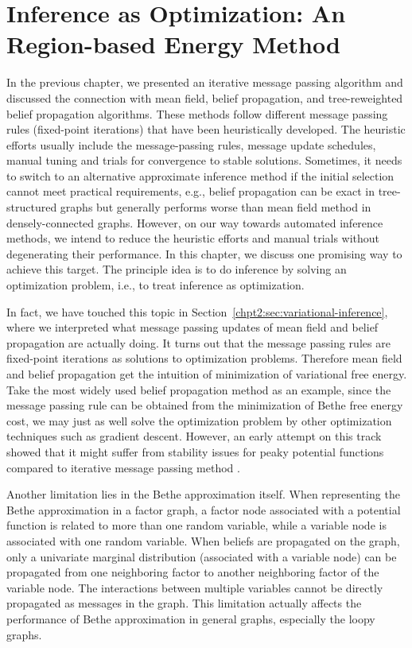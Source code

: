 \chapter{Inference as Optimization: An Region-based Energy Method}
\label{chapter4}
In the previous chapter, we presented an iterative message passing algorithm and discussed the connection with mean field, belief propagation, and tree-reweighted belief propagation algorithms. These methods follow different message passing rules (fixed-point iterations) that have been heuristically developed.
The heuristic efforts usually include the message-passing rules, message update schedules, manual tuning and trials for convergence to stable solutions. Sometimes, it needs to switch to an alternative approximate inference method if the initial selection cannot meet practical requirements, e.g., belief propagation can be exact in tree-structured graphs but generally performs worse than mean field method in densely-connected graphs.
However, on our way towards automated inference methods, we intend to reduce the heuristic efforts and manual trials without degenerating their performance. In this chapter, we discuss one promising way to achieve this target. The principle idea is to do inference by solving an optimization problem, i.e., to treat inference as optimization.

In fact, we have touched this topic in Section~\ref{chpt2:sec:variational-inference}, where we interpreted what message passing updates of mean field and belief propagation are actually doing. It turns out that the message passing rules are fixed-point iterations as solutions to optimization problems. Therefore mean field and belief propagation get the intuition of minimization of variational free energy. Take the most widely used belief propagation method as an example, since the message passing rule can be obtained from the minimization of Bethe free energy cost, we may just as well solve the optimization problem by other optimization techniques such as gradient descent. However, an early attempt on this track showed that it might suffer from stability issues for peaky potential functions compared to iterative message passing method \cite{welling2001belief}.


Another limitation lies in the Bethe approximation itself. When representing the Bethe approximation in a factor graph, a factor node associated with a potential function is related to more than one random variable, while a variable node is associated with one random variable. When beliefs are propagated on the graph, only a univariate marginal distribution (associated with a variable node) can be propagated from one neighboring factor to another neighboring factor of the variable node. The interactions between multiple variables cannot be directly propagated as messages in the graph. This limitation actually affects the performance of Bethe approximation in general graphs, especially the loopy graphs.

